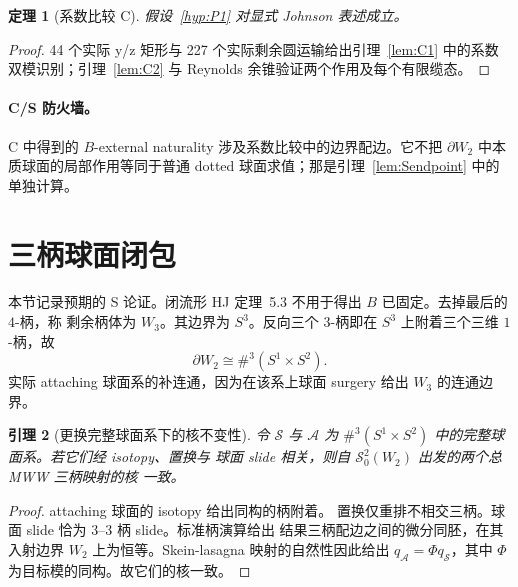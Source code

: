 \documentclass[11pt]{amsart}
\newtheorem{theorem}{定理}[section]
\newtheorem{lemma}[theorem]{引理}
\theoremstyle{definition}
\theoremstyle{remark}
\begin{document}
\begin{theorem}[系数比较 C]\label{thm:Cdischarge}
假设~\ref{hyp:P1} 对显式 Johnson 表述成立。
\end{theorem}

\begin{proof}
44 个实际 y/z 矩形与 227 个实际剩余圆运输给出引理~\ref{lem:C1} 中的系数双模识别；引理~\ref{lem:C2} 与 Reynolds 余锥验证两个作用及每个有限缆态。
\end{proof}

\paragraph{C/S 防火墙。}
C 中得到的 $B$-external naturality 涉及系数比较中的边界配边。它不把 $\partial W_2$ 中本质球面的局部作用等同于普通 dotted 球面求值；那是引理~\ref{lem:Sendpoint} 中的单独计算。
\section{三柄球面闭包}\label{sec:s-closure}

本节记录预期的 S 论证。闭流形 HJ
定理~5.3 不用于得出 $B$ 已固定。去掉最后的 $4$-柄，称
剩余柄体为 $W_3$。其边界为 $S^3$。反向三个
$3$-柄即在 $S^3$ 上附着三个三维 $1$-柄，故
\[
\partial W_2\cong\#^3(S^1\times S^2).
\]
实际 attaching 球面系的补连通，因为在该系上球面
surgery 给出 $W_3$ 的连通边界。

\begin{lemma}[更换完整球面系下的核不变性]
\label{lem:Ssystem}
令 \(\mathcal S\) 与 \(\mathcal A\) 为
\(\#^3(S^1\times S^2)\) 中的完整球面系。若它们经 isotopy、置换与
球面 slide 相关，则自 \(\mathcal S^2_0(W_2)\) 出发的两个总 MWW 三柄映射的核
一致。
\end{lemma}

\begin{proof}
attaching 球面的 isotopy 给出同构的柄附着。
置换仅重排不相交三柄。球面 slide 恰为
\(3\)--\(3\) 柄 slide。标准柄演算给出
结果三柄配边之间的微分同胚，在其入射边界 \(W_2\) 上为恒等。Skein-lasagna
映射的自然性因此给出 \(q_{\mathcal A}=\Phi q_{\mathcal S}\)，其中
\(\Phi\) 为目标模的同构。故它们的核一致。
\end{proof}
\end{document}

